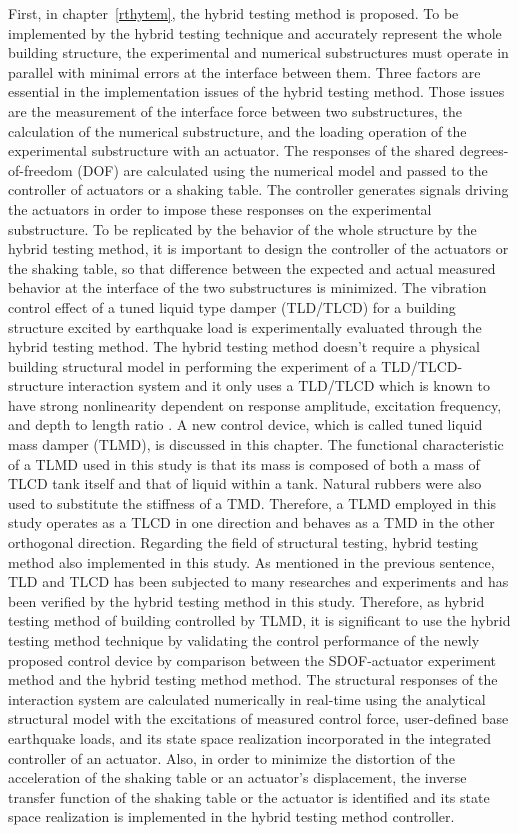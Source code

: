 First, in chapter~\ref{rthytem}, the hybrid testing method is proposed. To be implemented by the hybrid testing technique and accurately represent the whole building structure, the experimental and numerical substructures must operate in parallel with minimal errors at the interface between them. Three factors are essential in the implementation issues of the hybrid testing method. Those issues are the measurement of the interface force between two substructures, the calculation of the numerical substructure, and the loading operation of the experimental substructure with an actuator. The responses of the shared degrees-of-freedom (DOF) are calculated using the numerical model and passed to the controller of actuators or a shaking table. The controller generates signals driving the actuators in order to impose these responses on the experimental substructure. To be replicated by the behavior of the whole structure by the hybrid testing method, it is important to design the controller of the actuators or the shaking table, so that difference between the expected and actual measured behavior at the interface of the two substructures is minimized. The vibration control effect of a tuned liquid type damper (TLD/TLCD) for a building structure excited by earthquake load is experimentally evaluated through the hybrid testing method. The hybrid testing method doesn’t require a physical building structural model in performing the experiment of a TLD/TLCD-structure interaction system and it only uses a TLD/TLCD which is known to have strong nonlinearity dependent on response amplitude, excitation frequency, and depth to length ratio \citep{yalla2001liquid}. A new control device, which is called tuned liquid mass damper (TLMD), is discussed in this chapter. The functional characteristic of a TLMD used in this study is that its mass is composed of both a mass of TLCD tank itself and that of liquid within a tank. Natural rubbers were also used to substitute the stiffness of a TMD. Therefore, a TLMD employed in this study operates as a TLCD in one direction and behaves as a TMD in the other orthogonal direction. Regarding the field of structural testing, hybrid testing method also implemented in this study. As mentioned in the previous sentence, TLD and TLCD has been subjected to many researches and experiments and has been verified by the hybrid testing method in this study. Therefore, as hybrid testing method of building controlled by TLMD, it is significant to use the hybrid testing method technique by validating the control performance of the newly proposed control device by comparison between the SDOF-actuator experiment method and the hybrid testing method method. 
The structural responses of the interaction system are calculated numerically in real-time using the analytical structural model with the excitations of measured control force, user-defined base earthquake loads, and its state space realization incorporated in the integrated controller of an actuator. Also, in order to minimize the distortion of the acceleration of the shaking table or an actuator's displacement, the inverse transfer function of the shaking table or the actuator is identified and its state space realization is implemented in the hybrid testing method controller.

